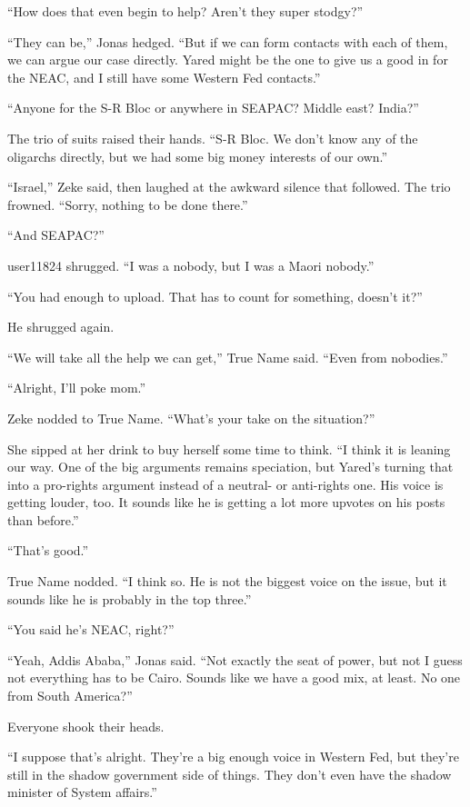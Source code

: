 ``How does that even begin to help? Aren't they super stodgy?''

``They can be,'' Jonas hedged. ``But if we can form contacts with each of them, we can argue our case directly. Yared might be the one to give us a good in for the NEAC, and I still have some Western Fed contacts.''

``Anyone for the S-R Bloc or anywhere in SEAPAC? Middle east? India?''

The trio of suits raised their hands. ``S-R Bloc. We don't know any of the oligarchs directly, but we had some big money interests of our own.''

``Israel,'' Zeke said, then laughed at the awkward silence that followed. The trio frowned. ``Sorry, nothing to be done there.''

``And SEAPAC?''

user11824 shrugged. ``I was a nobody, but I was a Maori nobody.''

``You had enough to upload. That has to count for something, doesn't it?''

He shrugged again.

``We will take all the help we can get,'' True Name said. ``Even from nobodies.''

``Alright, I'll poke mom.''

Zeke nodded to True Name. ``What's your take on the situation?''

She sipped at her drink to buy herself some time to think. ``I think it is leaning our way. One of the big arguments remains speciation, but Yared's turning that into a pro-rights argument instead of a neutral- or anti-rights one. His voice is getting louder, too. It sounds like he is getting a lot more upvotes on his posts than before.''

``That's good.''

True Name nodded. ``I think so. He is not the biggest voice on the issue, but it sounds like he is probably in the top three.''

``You said he's NEAC, right?''

``Yeah, Addis Ababa,'' Jonas said. ``Not exactly the seat of power, but not I guess not everything has to be Cairo. Sounds like we have a good mix, at least. No one from South America?''

Everyone shook their heads.

``I suppose that's alright. They're a big enough voice in Western Fed, but they're still in the shadow government side of things. They don't even have the shadow minister of System affairs.''

